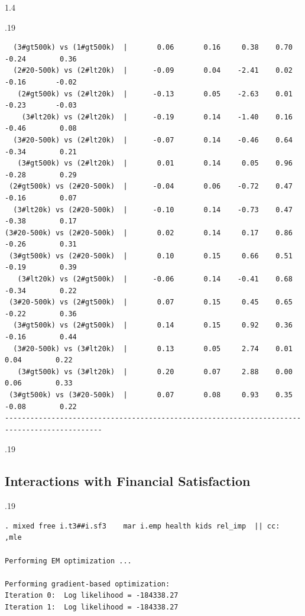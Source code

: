 \documentclass[10pt, letterpaper]{article}
\begin{document}
\begin{spacing}{1.4}
\begin{scriptsize}
\begin{spacing}{.19}
\begin{verbatim}
  (3#gt500k) vs (1#gt500k)  |       0.06       0.16     0.38    0.70        -0.24        0.36
  (2#20-500k) vs (2#lt20k)  |      -0.09       0.04    -2.41    0.02        -0.16       -0.02
   (2#gt500k) vs (2#lt20k)  |      -0.13       0.05    -2.63    0.01        -0.23       -0.03
    (3#lt20k) vs (2#lt20k)  |      -0.19       0.14    -1.40    0.16        -0.46        0.08
  (3#20-500k) vs (2#lt20k)  |      -0.07       0.14    -0.46    0.64        -0.34        0.21
   (3#gt500k) vs (2#lt20k)  |       0.01       0.14     0.05    0.96        -0.28        0.29
 (2#gt500k) vs (2#20-500k)  |      -0.04       0.06    -0.72    0.47        -0.16        0.07
  (3#lt20k) vs (2#20-500k)  |      -0.10       0.14    -0.73    0.47        -0.38        0.17
(3#20-500k) vs (2#20-500k)  |       0.02       0.14     0.17    0.86        -0.26        0.31
 (3#gt500k) vs (2#20-500k)  |       0.10       0.15     0.66    0.51        -0.19        0.39
   (3#lt20k) vs (2#gt500k)  |      -0.06       0.14    -0.41    0.68        -0.34        0.22
 (3#20-500k) vs (2#gt500k)  |       0.07       0.15     0.45    0.65        -0.22        0.36
  (3#gt500k) vs (2#gt500k)  |       0.14       0.15     0.92    0.36        -0.16        0.44
  (3#20-500k) vs (3#lt20k)  |       0.13       0.05     2.74    0.01         0.04        0.22
   (3#gt500k) vs (3#lt20k)  |       0.20       0.07     2.88    0.00         0.06        0.33
 (3#gt500k) vs (3#20-500k)  |       0.07       0.08     0.93    0.35        -0.08        0.22
---------------------------------------------------------------------------------------------
\end{verbatim}
\end{spacing}{.19}
\end{scriptsize}


\subsection{Interactions with Financial Satisfaction}



\begin{scriptsize}
\begin{spacing}{.19} 
\begin{verbatim}
. mixed free i.t3##i.sf3    mar i.emp health kids rel_imp  || cc:   ,mle

Performing EM optimization ...

Performing gradient-based optimization: 
Iteration 0:  Log likelihood = -184338.27  
Iteration 1:  Log likelihood = -184338.27  


\end{verbatim}
\end{spacing}
\end{scriptsize}
\end{spacing}
\end{document}
